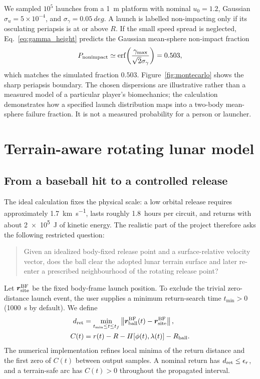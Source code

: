 We sampled \(10^5\) launches from a \SI{1}{m} platform with nominal \(u_0=1.2\), Gaussian \(\sigma_u=5\times10^{-4}\), and \(\sigma_\gamma=\SI{0.05}{deg}\). A launch is labelled non-impacting only if its osculating periapsis is at or above \(R\). If the small speed spread is neglected, Eq.~\eqref{eq:gamma_height} predicts the Gaussian mean-sphere non-impact fraction
\begin{equation}
 P_{\rm nonimpact}\simeq
 \operatorname{erf}\!\left(
 \frac{\gamma_{\max}}{\sqrt{2}\sigma_\gamma}
 \right)=0.503,
\end{equation}
which matches the simulated fraction \(0.503\). Figure~\ref{fig:montecarlo} shows the sharp periapsis boundary. The chosen dispersions are illustrative rather than a measured model of a particular player's biomechanics; the calculation demonstrates how a specified launch distribution maps into a two-body mean-sphere failure fraction. It is not a measured probability for a person or launcher.




\section{Terrain-aware rotating lunar model}

\subsection{From a baseball hit to a controlled release}

The ideal calculation fixes the physical scale: a low orbital release requires approximately \SI{1.7}{\kilo\metre\per\second}, lasts roughly \SI{1.8}{hours} per circuit, and returns with about \SI{2e5}{J} of kinetic energy. The realistic part of the project therefore asks the following restricted question:
\begin{quote}
Given an idealized body-fixed release point and a surface-relative velocity vector, does the ball clear the adopted lunar terrain surface and later re-enter a prescribed neighbourhood of the rotating release point?
\end{quote}

Let \(\bm{r}_{\rm site}^{\rm BF}\) be the fixed body-frame launch position. To exclude the trivial zero-distance launch event, the user supplies a minimum return-search time \(t_{\min}>0\) (\SI{1000}{s} by default). We define
\begin{align}
 d_{\rm ret}&=\min_{t_{\min}\leq t\leq t_f}
 \left\lVert \bm{r}_{\rm ball}^{\rm BF}(t)-\bm{r}_{\rm site}^{\rm BF}\right\rVert,
 \label{eq:dmin}\\
 C(t)&=r(t)-R-H[\phi(t),\lambda(t)]-R_{\rm ball}.
 \label{eq:clearance_v2}
\end{align}
The numerical implementation refines local minima of the return distance and the first zero of \(C(t)\) between output samples. A nominal return has \(d_{\rm ret}\leq\epsilon_r\), and a terrain-safe arc has \(C(t)>0\) throughout the propagated interval.

